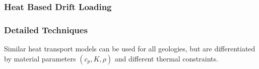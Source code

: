 

\begin{frame}
  \frametitle{Heat Based Drift Loading}

  
\end{frame}

\begin{frame}[ctb!]
  \frametitle{Detailed Techniques}
  
  Similar heat transport models can be used for all geologies, but are 
  differentiated by material parameters $(c_p, K, \rho)$ and different 
  thermal constraints.
\end{frame}
